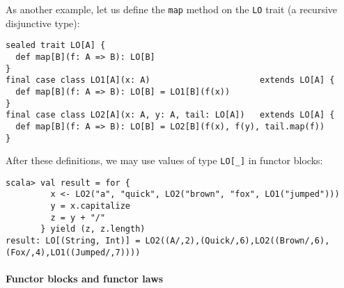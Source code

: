 As another example, let us define the \lstinline!map! method on the
\lstinline!LO! trait (a recursive disjunctive type):
\begin{lstlisting}
sealed trait LO[A] {
  def map[B](f: A => B): LO[B]
}
final case class LO1[A](x: A)                      extends LO[A] {
  def map[B](f: A => B): LO[B] = LO1[B](f(x))
}
final case class LO2[A](x: A, y: A, tail: LO[A])   extends LO[A] {
  def map[B](f: A => B): LO[B] = LO2[B](f(x), f(y), tail.map(f))
}
\end{lstlisting}
After these definitions, we may use values of type \lstinline!LO[_]!
in functor blocks:
\begin{lstlisting}
scala> val result = for {
         x <- LO2("a", "quick", LO2("brown", "fox", LO1("jumped")))
         y = x.capitalize
         z = y + "/"
       } yield (z, z.length)
result: LO[(String, Int)] = LO2((A/,2),(Quick/,6),LO2((Brown/,6),(Fox/,4),LO1((Jumped/,7))))
\end{lstlisting}


\paragraph{Functor blocks and functor laws}

